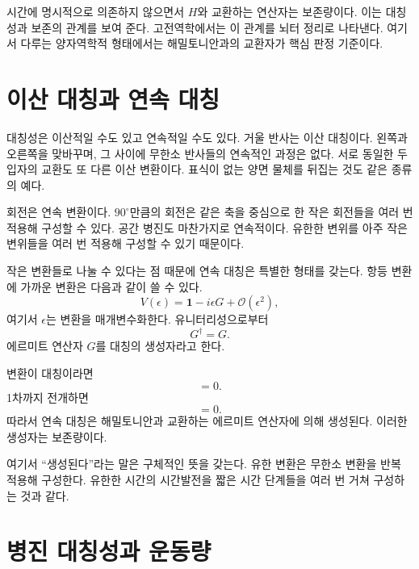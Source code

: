 시간에 명시적으로 의존하지 않으면서 \(H\)와 교환하는 연산자는 보존량이다. 이는 대칭성과 보존의 관계를 보여 준다. 고전역학에서는 이 관계를 뇌터 정리로 나타낸다. 여기서 다루는 양자역학적 형태에서는 해밀토니안과의 교환자가 핵심 판정 기준이다.

\section{이산 대칭과 연속 대칭}

대칭성은 이산적일 수도 있고 연속적일 수도 있다. 거울 반사는 이산 대칭이다. 왼쪽과 오른쪽을 맞바꾸며, 그 사이에 무한소 반사들의 연속적인 과정은 없다. 서로 동일한 두 입자의 교환도 또 다른 이산 변환이다. 표식이 없는 양면 물체를 뒤집는 것도 같은 종류의 예다.

회전은 연속 변환이다. \(90^\circ\)만큼의 회전은 같은 축을 중심으로 한 작은 회전들을 여러 번 적용해 구성할 수 있다. 공간 병진도 마찬가지로 연속적이다. 유한한 변위를 아주 작은 변위들을 여러 번 적용해 구성할 수 있기 때문이다.

작은 변환들로 나눌 수 있다는 점 때문에 연속 대칭은 특별한 형태를 갖는다. 항등 변환에 가까운 변환은 다음과 같이 쓸 수 있다.
\begin{equation}
V(\epsilon)
=
\mathbf 1-i\epsilon G+\mathcal O(\epsilon^2),
\end{equation}
여기서 \(\epsilon\)는 변환을 매개변수화한다. 유니터리성으로부터
\begin{equation}
G^\dagger=G.
\end{equation}
에르미트 연산자 \(G\)를 대칭의 생성자라고 한다.

변환이 대칭이라면
\begin{equation}
[H,V(\epsilon)]=0.
\end{equation}
1차까지 전개하면
\begin{equation}
[H,G]=0.
\end{equation}
따라서 연속 대칭은 해밀토니안과 교환하는 에르미트 연산자에 의해 생성된다. 이러한 생성자는 보존량이다.

여기서 ``생성된다''라는 말은 구체적인 뜻을 갖는다. 유한 변환은 무한소 변환을 반복 적용해 구성한다. 유한한 시간의 시간발전을 짧은 시간 단계들을 여러 번 거쳐 구성하는 것과 같다.

\section{병진 대칭성과 운동량}

